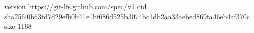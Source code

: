 version https://git-lfs.github.com/spec/v1
oid sha256:0b63fd7d29efb0b41e1bf686d525b3074bc1db2aa33aebed869fa46eb4af370c
size 1168
